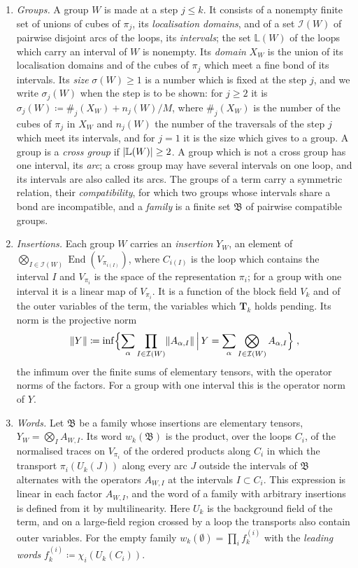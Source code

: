 \documentclass[11pt]{preprint}
\DeclarePairedDelimiter{\abs}{\lvert}{\rvert}
\DeclarePairedDelimiter{\norm}{\lVert}{\rVert}
\numberwithin{equation}{section}
\theoremstyle{definition}
\theoremstyle{remark}
\theoremstyle{plain}
\begin{document}
\begin{enumerate}[label=(\alph*)]
\item \emph{Groups.} A group $W$ is made at a step $j \leq k$. It consists of a nonempty finite set of unions of cubes of $\pi_j$, its \emph{localisation domains}, and of a set $\mathcal I(W)$ of pairwise disjoint arcs of the loops, its \emph{intervals}; the set $\mathbb L(W)$ of the loops which carry an interval of $W$ is nonempty. Its \emph{domain} $X_W$ is the union of its localisation domains and of the cubes of $\pi_j$ which meet a fine bond of its intervals. Its \emph{size} $\sigma(W) \geq 1$ is a number which is fixed at the step $j$, and we write $\sigma_j(W)$ when the step is to be shown: for $j \geq 2$ it is $\sigma_j(W) \coloneqq \#_j(X_W) + n_j(W)/M$, where $\#_j(X_W)$ is the number of the cubes of $\pi_j$ in $X_W$ and $n_j(W)$ the number of the traversals of the step $j$ which meet its intervals, and for $j = 1$ it is the size which \cite{WilsonFirstStep} gives to a group. A group is a \emph{cross group} if $\abs{\mathbb L(W)} \geq 2$. A group which is not a cross group has one interval, its \emph{arc}; a cross group may have several intervals on one loop, and its intervals are also called its arcs. The groups of a term carry a symmetric relation, their \emph{compatibility}, for which two groups whose intervals share a bond are incompatible, and a \emph{family} is a finite set $\mathfrak B$ of pairwise compatible groups.
\item \emph{Insertions.} Each group $W$ carries an \emph{insertion} $Y_W$, an element of $\bigotimes_{I \in \mathcal I(W)}\operatorname{End}(V_{\pi_{i(I)}})$, where $C_{i(I)}$ is the loop which contains the interval $I$ and $V_{\pi_i}$ is the space of the representation $\pi_i$; for a group with one interval it is a linear map of $V_{\pi_i}$. It is a function of the block field $V_k$ and of the outer variables of the term, the variables which $\mathbf T_k$ holds pending. Its norm is the projective norm
\begin{equation}\label{eq:projective-norm}
    \norm{Y} \coloneqq \inf\Bigl\{ \sum_\alpha\prod_{I \in \mathcal I(W)}\norm{A_{\alpha,I}} \,\Big|\, Y = \sum_\alpha\bigotimes_{I \in \mathcal I(W)}A_{\alpha,I} \Bigr\}\;,
\end{equation}
the infimum over the finite sums of elementary tensors, with the operator norms of the factors. For a group with one interval this is the operator norm of $Y$.
\item \emph{Words.} Let $\mathfrak B$ be a family whose insertions are elementary tensors, $Y_W = \bigotimes_IA_{W,I}$. Its word $w_k(\mathfrak B)$ is the product, over the loops $C_i$, of the normalised traces on $V_{\pi_i}$ of the ordered products along $C_i$ in which the transport $\pi_i(U_k(J))$ along every arc $J$ outside the intervals of $\mathfrak B$ alternates with the operators $A_{W,I}$ at the intervals $I \subset C_i$. This expression is linear in each factor $A_{W,I}$, and the word of a family with arbitrary insertions is defined from it by multilinearity. Here $U_k$ is the background field of the term, and on a large-field region crossed by a loop the transports also contain outer variables. For the empty family $w_k(\emptyset) = \prod_if^{(i)}_k$ with the \emph{leading words} $f^{(i)}_k \coloneqq \chi_i(U_k(C_i))$.

\end{enumerate}
\end{document}
